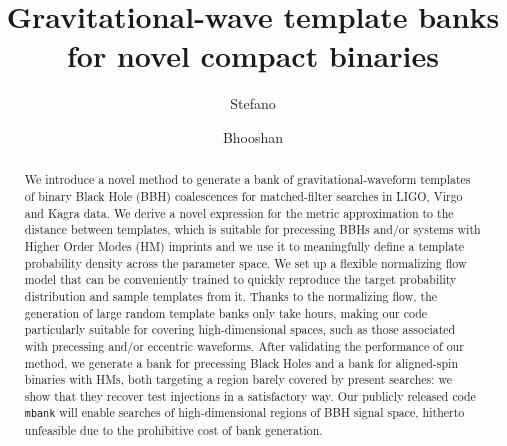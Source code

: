 \documentclass[twocolumn,showpacs,preprintnumbers,nofootinbib,prd,
superscriptaddress,10pt]{revtex4-2}
\begin{document}
\begin{abstract}
	We introduce a novel method to generate a bank of gravitational-waveform templates of binary Black Hole (BBH) coalescences for matched-filter searches in LIGO, Virgo and Kagra data.
	We derive a novel expression for the metric approximation to the distance between templates, which is suitable for precessing BBHs and/or systems with Higher Order Modes (HM) imprints and we use it to meaningfully define a template probability density across the parameter space.
	We set up a flexible normalizing flow model that can be conveniently trained to quickly reproduce the target probability distribution and sample templates from it. Thanks to the normalizing flow, the generation of large random template banks only take hours, making our code particularly suitable for covering high-dimensional spaces, such as those associated with precessing and/or eccentric waveforms.
	After validating the performance of our method, we generate a bank for precessing Black Holes and a bank for aligned-spin binaries with HMs, both targeting a region barely covered by present searches: we show that they recover test injections in a satisfactory way.
	Our publicly released code \texttt{mbank} will enable searches of high-dimensional regions of BBH signal space, hitherto unfeasible due to the prohibitive cost of bank generation.
	
\end{abstract}
	
 \title{Gravitational-wave template banks for novel compact binaries}
	\author{Stefano }

	\author{Bhooshan }
        
\end{document}
